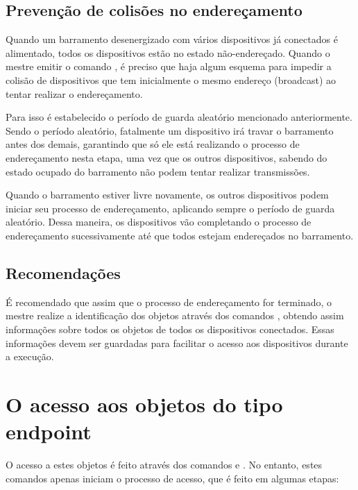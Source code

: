 \subsection{Prevenção de colisões no endereçamento}

Quando um barramento desenergizado com vários dispositivos já conectados é alimentado, todos os dispositivos estão no estado não-endereçado. Quando o mestre emitir o comando , é preciso que haja algum esquema para impedir a colisão de dispositivos que tem inicialmente o mesmo endereço (broadcast) ao tentar realizar o endereçamento.

Para isso é estabelecido o período de guarda aleatório mencionado anteriormente. Sendo o período aleatório, fatalmente um dispositivo irá travar o barramento antes dos demais, garantindo que só ele está realizando o processo de endereçamento nesta etapa, uma vez que os outros dispositivos, sabendo do estado ocupado do barramento não podem tentar realizar transmissões.

Quando o barramento estiver livre novamente, os outros dispositivos podem iniciar seu processo de endereçamento, aplicando sempre o período de guarda aleatório. Dessa maneira, os dispositivos vão completando o processo de endereçamento sucessivamente até que todos estejam endereçados no barramento.

\subsection{Recomendações}

É recomendado que assim que o processo de endereçamento for terminado, o mestre realize a identificação dos objetos através dos comandos , obtendo assim informações sobre todos os objetos de todos os dispositivos conectados. Essas informações devem ser guardadas para facilitar o acesso aos dispositivos durante a execução.

\section{O acesso aos objetos do tipo endpoint}

O acesso a estes objetos é feito através dos comandos  e . No entanto, estes comandos apenas iniciam o processo de acesso, que é feito em algumas etapas:

